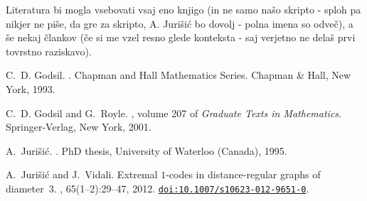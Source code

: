 \documentclass[a4paper,11pt]{article}
\newcommand{\doi}[1]{\href{http://dx.doi.org/#1}{\texttt{doi:#1}}}
\begin{document}
Literatura bi mogla vsebovati vsaj eno knjigo (in ne samo našo
skripto - sploh pa nikjer ne piše, da gre za skripto, A. Jurišić bo
dovolj - polna imena so odveč), a še nekaj člankov (če si me vzel
resno glede konteksta - saj verjetno ne delaš prvi tovrstno raziskavo).

\begin{footnotesize}
      \begin{thebibliography}{10}
            C.~D. Godsil.
            .
            \newblock Chapman and Hall Mathematics Series. Chap\-man \& Hall, New York,
            1993.

            C.~D. Godsil and G.~Royle.
            , volume 207 of {\em Graduate Texts in
                        Mathematics}.
            \newblock Springer-Verlag, New York, 2001.


            A.~Jurišić.
            .
            \newblock PhD thesis, University of Waterloo (Canada), 1995.

            A.~Jurišić and J.~Vidali.
            \newblock Extremal $1$-codes in distance-regular graphs of dia\-meter~$3$.
            , 65(1--2):29--47, 2012.
            \newblock \doi{10.1007/s10623-012-9651-0}.

      \end{thebibliography}
\end{footnotesize}
\end{document}
